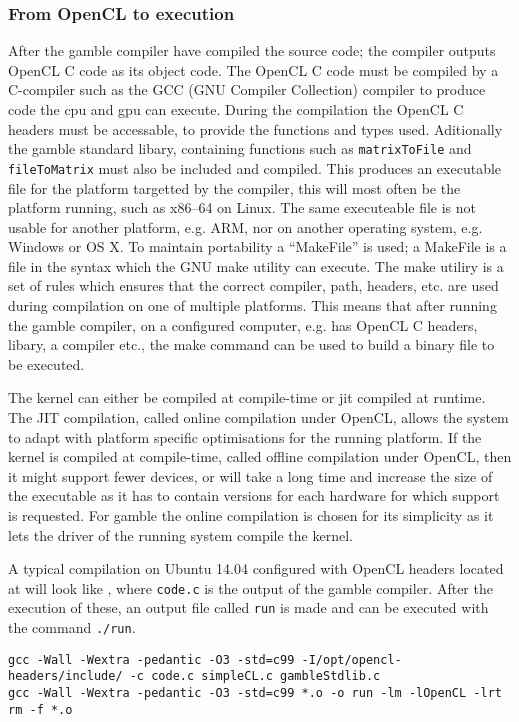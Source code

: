 \subsubsection*{From OpenCL to execution}\label{ssub:makefile}
After the \gls{gamble} compiler have compiled the source code; the compiler outputs OpenCL C code as its object code.
The OpenCL C code must be compiled by a C-compiler such as the GCC (GNU Compiler Collection) compiler to produce code the \acrshort{cpu} and \acrshort{gpu} can execute.
During the compilation the OpenCL C headers must be accessable, to provide the functions and types used. 
Aditionally the \gls{gamble} standard libary, containing functions such as \texttt{matrixToFile} and \texttt{fileToMatrix} must also be included and compiled. 
This produces an executable file for the platform targetted by the compiler, this will most often be the platform running, such as x86--64 on Linux.
The same executeable file is not usable for another platform, e.g. ARM, nor on another operating system, e.g. Windows or OS X.
To maintain portability a ``MakeFile'' is used; a MakeFile is a file in the syntax which the GNU make utility can execute. 
The make utiliry is a set of rules which ensures that the correct compiler, path, headers, etc. are used during compilation on one of multiple platforms. 
This means that after running the \gls{gamble} compiler, on a configured computer, e.g. has OpenCL C headers, libary, a compiler etc., the make command can be used to build a binary file to be executed.

The kernel can either be compiled at compile-time or \acrshort{jit} compiled at runtime.
The JIT compilation, called online compilation under OpenCL, allows the system to adapt with platform specific optimisations for the running platform.
If the kernel is compiled at compile-time, called offline compilation under OpenCL, then it might support fewer devices, or will take a long time and increase the size of the executable as it has to contain versions for each hardware for which support is requested. \citep{openclbookjit}
For \gls{gamble} the online compilation is chosen for its simplicity as it lets the driver of the running system compile the kernel. 

A typical compilation on Ubuntu 14.04 configured with OpenCL headers located at  will look like , where \texttt{code.c} is the output of the \gls{gamble} compiler.
After the execution of these, an output file called \texttt{run} is made and can be executed with the command \texttt{./run}. 

\begin{lstlisting}[caption=The commands executed by the make command according to the rules of the MakeFile,numbers=none,frame=tlrb,label={lst:makecommands}]
gcc -Wall -Wextra -pedantic -O3 -std=c99 -I/opt/opencl-headers/include/ -c code.c simpleCL.c gambleStdlib.c
gcc -Wall -Wextra -pedantic -O3 -std=c99 *.o -o run -lm -lOpenCL -lrt
rm -f *.o
\end{lstlisting}
